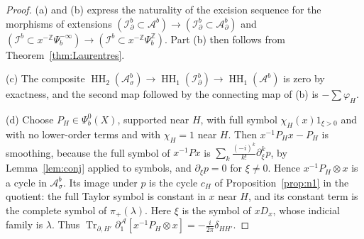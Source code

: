 \documentclass[11pt,oneside,reqno]{article}
\DeclareMathOperator{\HH}{HH}
\newcommand{\Z}{\mathbb Z}
\DeclareMathOperator{\Tr}{Tr}
\newcommand{\Ib}{\mathcal I^b}
\newcommand{\Idb}{\mathcal I^b_\partial}
\newcommand{\Ab}{\mathcal A^b}
\newcommand{\Asb}{\mathcal A^b_\sigma}
\newcommand{\Adb}{\mathcal A^b_\partial}
\theoremstyle{plain}
\theoremstyle{definition}
\theoremstyle{remark}
\begin{document}
\begin{proof}
(a) and (b) express the naturality of the excision sequence for the
morphisms of extensions \((\Idb\subset\Ab)\to(\Idb\subset\Adb)\) and
\((\Ib\subset x^{-\Z}\Psi_b^{-\infty})\to(\Ib\subset x^{-\Z}\Psi_b^{\Z})\).
Part (b) then follows from Theorem~\ref{thm:Laurentres}.

(c) The composite \(\HH_2(\Asb)\to\HH_1(\Idb)\to\HH_1(\Ab)\) is zero by
exactness, and the second map followed by the connecting map of (b) is
\(-\sum\varphi_H\).

(d) Choose \(P_H\in\Psi_b^0(X)\), supported near \(H\), with full symbol
\(\chi_H(x)1_{\xi>0}\) and with no lower-order terms and with \(\chi_H=1\) near \(H\).
Then \(x^{-1}P_Hx-P_H\)
is smoothing, because the full symbol of \(x^{-1}Px\) is
\(\sum_k\frac{(-i)^k}{k!}\partial_\xi^kp\), by Lemma~\ref{lem:conj} applied
to symbols, and \(\partial_\xi p=0\) for \(\xi\neq0\). Hence
\(x^{-1}P_H\otimes x\) is a cycle in \(\Asb\). Its image under \(p\)
is the cycle \(c_H\) of Proposition~\ref{prop:n1} in the quotient:
the full Taylor symbol is constant in \(x\) near \(H\), and its
constant term is the complete symbol of \(\pi_+(\lambda)\). Here
\(\xi\) is the symbol of \(xD_x\), whose indicial family is \(\lambda\). Thus
\(\Tr_{\partial,H'}\partial^{\mathcal A}_1[x^{-1}P_H\otimes x]=
-\frac{i}{2\pi}\delta_{HH'}\).
\end{proof}
\end{document}
